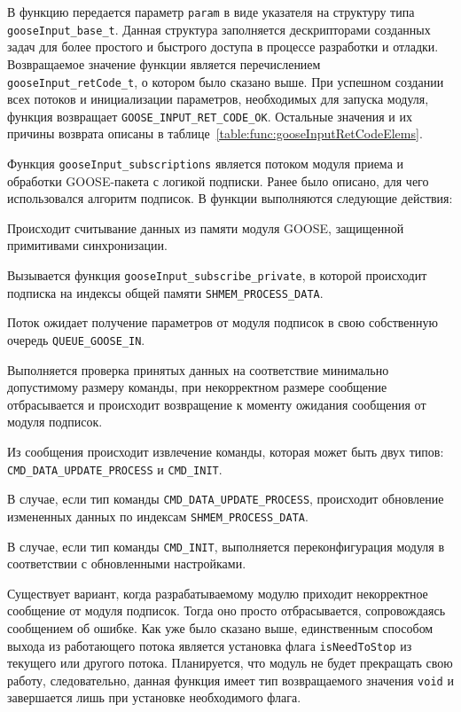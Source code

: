 В функцию передается параметр \lstinline{param} в виде указателя на структуру типа \lstinline{gooseInput_base_t}.
Данная структура заполняется дескрипторами созданных задач для более простого и быстрого доступа в процессе разработки и отладки.
Возвращаемое значение функции является перечислением
\lstinline{gooseInput_retCode_t}, о котором было сказано выше. При успешном создании всех потоков и инициализации параметров, необходимых для запуска модуля, функция возвращает \lstinline{GOOSE_INPUT_RET_CODE_OK}. Остальные значения и их
причины возврата описаны в таблице~\ref{table:func:gooseInputRetCodeElems}.

Функция \lstinline{gooseInput_subscriptions} является потоком модуля приема и обработки GOOSE-пакета с логикой подписки. Ранее было описано, для чего использовался алгоритм подписок. В функции выполняются следующие действия:

\begin{enumerate_num}
    \item Происходит считывание данных из памяти модуля GOOSE, защищенной примитивами синхронизации.
    \item Вызывается функция \lstinline{gooseInput_subscribe_private}, в которой происходит подписка на индексы общей памяти \lstinline{SHMEM_PROCESS_DATA}.
    \item Поток ожидает получение параметров от модуля подписок в свою собственную очередь \lstinline{QUEUE_GOOSE_IN}.
    \item Выполняется проверка принятых данных на соответствие минимально допустимому размеру команды, при некорректном размере сообщение отбрасывается и происходит возвращение к моменту ожидания сообщения от модуля подписок.
    \item Из сообщения происходит извлечение команды, которая может быть двух типов: \lstinline{CMD_DATA_UPDATE_PROCESS} и \lstinline{CMD_INIT}.
    \item В случае, если тип команды \lstinline{CMD_DATA_UPDATE_PROCESS}, происходит обновление измененных данных по индексам \lstinline{SHMEM_PROCESS_DATA}.
    \item В случае, если тип команды \lstinline{CMD_INIT}, выполняется переконфигурация модуля в соответствии с обновленными настройками.
\end{enumerate_num}

Существует вариант, когда разрабатываемому модулю приходит некорректное сообщение от модуля подписок. Тогда оно просто отбрасывается, сопровождаясь сообщением об ошибке. Как уже было сказано выше, единственным способом выхода из работающего потока является установка флага \lstinline{isNeedToStop} из текущего или другого потока. Планируется, что модуль не будет прекращать свою работу, следовательно, данная функция имеет тип возвращаемого значения \lstinline{void} и завершается лишь при установке необходимого флага.

